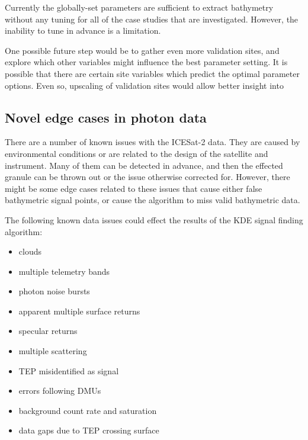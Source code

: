 Currently the globally-set parameters are sufficient to extract bathymetry without any tuning for all of the case studies that are investigated. However, the inability to tune in advance is a limitation. 

One possible future step would be to gather even more validation sites, and explore which other variables might influence the best parameter setting. It is possible that there are certain site variables which predict the optimal parameter options. Even so, upscaling of validation sites would allow better insight into 

\subsection{Novel edge cases in photon data}\label{sec:discussion-photon-issues}

There are a number of known issues with the ICESat-2 data. They are caused by environmental conditions or are related to the design of the satellite and instrument. Many of them can be detected in advance, and then the effected granule can be thrown out or the issue otherwise corrected for. However, there might be some edge cases related to these issues that cause either false bathymetric signal points, or cause the algorithm to miss valid bathymetric data. 

The following known data issues could effect the results of the KDE signal finding algorithm:

\begin{itemize}
    \item clouds
    \item multiple telemetry bands
    \item photon noise bursts %
    \item apparent multiple surface returns %
    \item specular returns
    \item multiple scattering %
    \item TEP misidentified as signal %
    \item errors following DMUs %
    \item background count rate and saturation
    \item data gaps due to TEP crossing surface %
\end{itemize}

